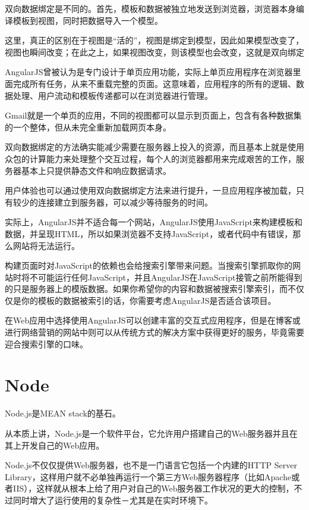 双向数据绑定是不同的。首先，模板和数据被独立地发送到浏览器，浏览器本身编译模板到视图，同时把数据导入一个模型。

这里，真正的区别在于视图是“活的”，视图是绑定到模型，因此如果模型改变了，视图也瞬间改变；在此之上，如果视图改变，则该模型也会改变，这就是双向绑定

AngularJS曾被认为是专门设计于单页应用功能，实际上单页应用程序在浏览器里面完成所有任务，从来不重载完整的页面。这意味着，应用程序的所有的逻辑、数据处理、用户流动和模板传递都可以在浏览器进行管理。

Gmail就是一个单页的应用，不同的视图都可以显示到页面上，包含有各种数据集的一个整体，但从未完全重新加载网页本身。

双向数据绑定的方法确实能减少需要在服务器上投入的资源，而且基本上就是使用众包的计算能力来处理整个交互过程，每个人的浏览器都用来完成艰苦的工作，服务器基本上只提供静态文件和响应数据请求。

用户体验也可以通过使用双向数据绑定方法来进行提升，一旦应用程序被加载，只有较少的连接建立到服务器，可以减少等待服务的时间。

实际上，AngularJS并不适合每一个网站，AngularJS使用JavaScript来构建模板和数据，并呈现HTML，所以如果浏览器不支持JavaScript，或者代码中有错误，那么网站将无法运行。


构建页面时对JavaScript的依赖也会给搜索引擎带来问题。当搜索引擎抓取你的网站时将不可能运行任何JavaScript，并且AngularJS在JavaScript接管之前所能得到的只是服务器上的模版数据。如果你希望你的内容和数据被搜索引擎索引，而不仅仅是你的模板的数据被索引的话，你需要考虑AngularJS是否适合该项目。


在Web应用中选择使用AngularJS可以创建丰富的交互式应用程序，但是在博客或进行网络营销的网站中则可以从传统方式的解决方案中获得更好的服务，毕竟需要迎合搜索引擎的口味。



\section{Node}


Node.js是MEAN stack的基石。

从本质上讲，Node.js是一个软件平台，它允许用户搭建自己的Web服务器并且在其上开发自己的Web应用。

Node.js不仅仅提供Web服务器，也不是一门语言它包括一个内建的HTTP Server Library，这样用户就不必单独再运行一个第三方Web服务器程序（比如Apache或者IIS），这样就从根本上给了用户对自己的Web服务器工作状况的更大的控制，不过同时增大了运行使用的复杂性－尤其是在实时环境下。


